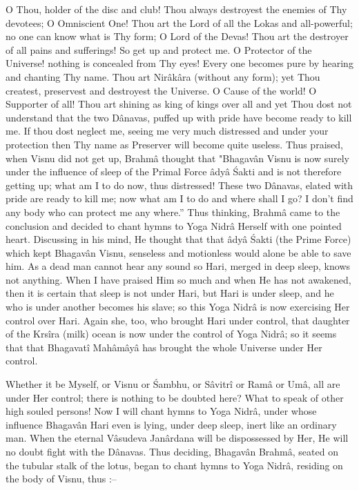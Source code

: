 O Thou, holder of the disc and club! Thou always destroyest the enemies of Thy devotees; O Omniscient One! Thou art the Lord of all the Lokas and all-powerful; no one can know what is Thy form; O Lord of the Devas! Thou art the destroyer of all pains and sufferings! So get up and protect me. O Protector of the Universe! nothing is concealed from Thy eyes! Every one becomes pure by hearing and chanting Thy name. Thou art Nir\^ak\^ara (without any form); yet Thou createst, preservest and destroyest the Universe. O Cause of the world! O Supporter of all! Thou art shining as king of kings over all and yet Thou dost not understand that the two D\^anavas, puffed up with pride have become ready to kill me. If thou dost neglect me, seeing me very much distressed and under your protection then Thy name as Preserver will become quite useless. Thus praised, when Visnu did not get up, Brahm\^a thought that "Bhagav\^an Visnu is now surely under the influence of sleep of the Primal Force \^ady\^a \'Sakti and is not therefore getting up; what am I to do now, thus distressed! These two D\^anavas, elated with pride are ready to kill me; now what am I to do and where shall I go? I don't find any body who can protect me any where.'' Thus thinking, Brahm\^a came to the conclusion and decided to chant hymns to Yoga Nidr\^a Herself with one pointed heart. Discussing in his mind, He thought that that \^ady\^a \'Sakti (the Prime Force) which kept Bhagav\^an Visnu, senseless and motionless would alone be able to save him. As a dead man cannot hear any sound so Hari, merged in deep sleep, knows not anything. When I have praised Him so much and when He has not awakened, then it is certain that sleep is not under Hari, but Hari is under sleep, and he who is under another becomes his slave; so this Yoga Nidr\^a is now exercising Her control over Hari. Again she, too, who brought Hari under control, that daughter of the Krs\^ira (milk) ocean is now under the control of Yoga Nidr\^a; so it seems that that Bhagavat\^i Mah\^am\^ay\^a has brought the whole Universe under Her control.

Whether it be Myself, or Visnu or \'Sambhu, or S\^avitr\^i or Ram\^a or Um\^a, all are under Her control; there is nothing to be doubted here? What to speak of other high souled persons! Now I will chant hymns to Yoga Nidr\^a, under whose influence Bhagav\^an Hari even is lying, under deep sleep, inert like an ordinary man. When the eternal V\^asudeva Jan\^ardana will be dispossessed by Her, He will no doubt fight with the D\^anavas. Thus deciding, Bhagav\^an Brahm\^a, seated on the tubular stalk of the lotus, began to chant hymns to Yoga Nidr\^a, residing on the body of Visnu, thus :--

